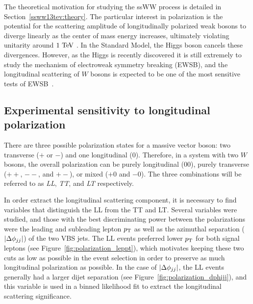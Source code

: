 The theoretical motivation for studying the ssWW process is detailed in Section~\ref{ssww13tev:theory}.
The particular interest in polarization is the potential for the scattering amplitude of longitudinally polarized weak bosons to diverge linearly as the center of mass energy increases, ultimately violating unitarity around $1\tev$ \cite{1977.ben-lee-weak-interactions}.
In the Standard Model, the Higgs boson cancels these divergences.
However, as the Higgs is recently discovered it is still extremely to study the mechanism of electroweak symmetry breaking (EWSB), and the longitudinal scattering of $W$ bosons is expected to be one of the most sensitive tests of EWSB~\cite{2013.longitudinal-theory}.


\subsection{Experimental sensitivity to longitudinal polarization}\label{sec:sswwupgrade_longitudinal_sens}
There are three possible polarization states for a massive vector boson: two transverse ($+$ or $-$) and one longitudinal ($0$).
Therefore, in a system with two $W$ bosons, the overall polarization can be purely longitudinal ($00$), purely transverse ($++$, $--$, and $+-$), or mixed ($+0$ and $-0$).
The three combinations will be referred to as \emph{LL}, \emph{TT}, and \emph{LT} respectively.

In order extract the longitudinal scattering component, it is necessary to find variables that distinguish the LL from the TT and LT.
Several variables were studied, and those with the best discriminating power between the polarizations were the leading and subleading lepton $p_{\mathrm{T}}$ as well as the azimuthal separation ($|\Delta\phi_{jj}|$) of the two VBS jets.
The LL events preferred lower $p_{\mathrm{T}}$ for both signal leptons (see Figure~\ref{fig:polarization_leppt}), which motivates keeping these two cuts as low as possible in the event selection in order to preserve as much longitudinal polarization as possible.
In the case of $|\Delta\phi_{jj}|$, the LL events generally had a larger dijet separation (see Figure~\ref{fig:polarization_dphijj}), and this variable is used in a binned likelihood fit to extract the longitudinal scattering significance.

